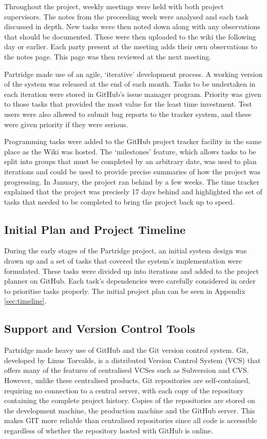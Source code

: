 Throughout the project, weekly meetings were held with both project
supervisors. The notes from the preceeding week were analysed and each task
discussed in depth. New tasks were then noted down along with any observations
that should be documented. These were then uploaded to the wiki the following
day or earlier. Each party present at the meeting adds their own observations
to the notes page. This page was then reviewed at the next meeting.

Partridge made use of an agile, `iterative' development process. A working
version of the system was released at the end of each month. Tasks to be
undertaken in each iteration were stored in GitHub's issue manager program.
Priority was given to those tasks that provided the most value for the least
time investment. Test users were also allowed to submit bug reports to the
tracker system, and these were given priority if they were serious.

Programming tasks were added to the GitHub project tracker facility in the
same place as the Wiki was hosted. The `milestones' feature, which allows tasks
to be split into groups that must be completed by an arbitrary date, was used
to plan iterations and could be used to provide precise summaries of how the
project was progressing. In January, the project ran behind by a few weeks.
The time tracker explained that the project was precisely 17 days behind and
highlighted the set of tasks that needed to be completed to bring the project
back up to speed.

\subsection{ Initial Plan and Project Timeline }

During the early stages of the Partridge project, an initial system design was
drawn up and a set of tasks that covered the system's implementation were
formulated. These tasks were divided up into iterations and added to the
project planner on GitHub. Each task's dependencies were carefully considered
in order to prioritise tasks properly. The initial project plan can be seen in
Appendix \ref{sec:timeline}. 

\subsection{Support and Version Control Tools}

Partridge made heavy use of GitHub and the Git version control system. Git,
developed by Linus Torvalds, is a distributed Version Control System (VCS) that
offers many of the features of centralised VCSes such as Subversion and CVS.
However, unlike these centralised products, Git repositories are
self-contained, requiring no connection to a central server, with each copy of
the repository containing the complete project history. Copies of the
repositories are stored on the development machine, the production machine and
the GitHub server. This makes GIT more reliable than centralised repositories
since all code is accessible regardless of whether the repository hosted with
GitHub is online.

